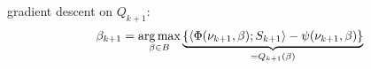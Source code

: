 \documentclass[a4paper]{article}
\begin{document}
\begin{myText}
\begin{myAlgorithm}[13cm]
{         \quad \myBullet[blue] gradient descent on $Q_{k+1}$: $$\beta_{k+1} = \operatorname*{arg\,max}_{\beta\in B}\underbrace{\left\{\left\langle \Phi(\nu_{k+1},\beta) ; S_{k+1}\right\rangle - \psi(\nu_{k+1}, \beta)\right\}}_{=Q_{k+1}(\beta)} $$
    }
\end{myAlgorithm}


\end{myText}


























\newpage
\end{document}
